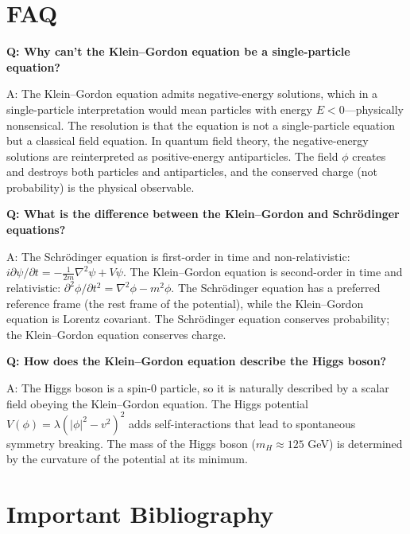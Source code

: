 \documentclass[11pt,openright]{book}
\begin{document}

\section*{FAQ}

\textbf{Q: Why can't the Klein--Gordon equation be a single-particle equation?}

A: The Klein--Gordon equation admits negative-energy solutions, which in a single-particle interpretation would mean particles with energy $E < 0$---physically nonsensical. The resolution is that the equation is not a single-particle equation but a classical field equation. In quantum field theory, the negative-energy solutions are reinterpreted as positive-energy antiparticles. The field $\phi$ creates and destroys both particles and antiparticles, and the conserved charge (not probability) is the physical observable.

\textbf{Q: What is the difference between the Klein--Gordon and Schr\"odinger equations?}

A: The Schr\"odinger equation is first-order in time and non-relativistic: $i\partial\psi/\partial t = -\frac{1}{2m}\nabla^2\psi + V\psi$. The Klein--Gordon equation is second-order in time and relativistic: $\partial^2\phi/\partial t^2 = \nabla^2\phi - m^2\phi$. The Schr\"odinger equation has a preferred reference frame (the rest frame of the potential), while the Klein--Gordon equation is Lorentz covariant. The Schr\"odinger equation conserves probability; the Klein--Gordon equation conserves charge.

\textbf{Q: How does the Klein--Gordon equation describe the Higgs boson?}

A: The Higgs boson is a spin-0 particle, so it is naturally described by a scalar field obeying the Klein--Gordon equation. The Higgs potential $V(\phi) = \lambda(|\phi|^2 - v^2)^2$ adds self-interactions that lead to spontaneous symmetry breaking. The mass of the Higgs boson ($m_H \approx 125$ GeV) is determined by the curvature of the potential at its minimum.
\section*{Important Bibliography}
\end{document}
